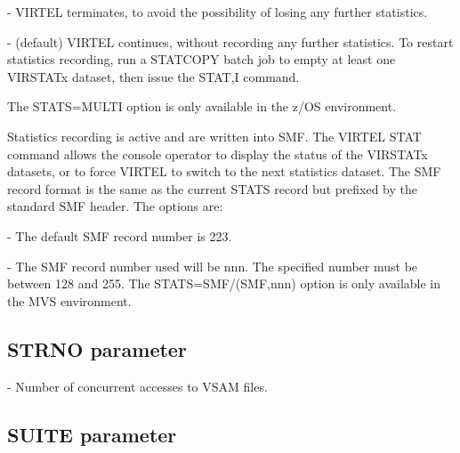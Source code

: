 \documentclass[letterpaper,10pt,english]{sphinxmanual}
\begin{document}
 - VIRTEL terminates, to avoid the possibility of losing any further statistics.

 - (default) VIRTEL continues, without recording any further statistics. To restart statistics recording, run a STATCOPY batch job to empty at least one VIRSTATx dataset, then issue the STAT,I command.

The STATS=MULTI option is only available in the z/OS environment.

 Statistics recording is active and are written into SMF. The VIRTEL STAT command allows the console operator to display the status of the VIRSTATx datasets, or to force VIRTEL to switch to the next statistics dataset. The SMF record format is the same as the current STATS record but prefixed by the standard SMF header. The options are:

 - The default SMF record number is 223.

 - The SMF record number used will be nnn. The specified number must be between 128 and 255. The STATS=SMF/(SMF,nnn) option is only available in the MVS environment.


\subsection{STRNO parameter}
\label{\detokenize{Installation_Guide:strno-parameter}}\label{\detokenize{Installation_Guide:index-118}}
\begin{sphinxVerbatim}[commandchars=\\\{\}]
 
\end{sphinxVerbatim}

 - Number of concurrent accesses to VSAM files.


\subsection{SUITE parameter}
\label{\detokenize{Installation_Guide:suite-parameter}}\label{\detokenize{Installation_Guide:index-119}}
\begin{sphinxVerbatim}[commandchars=\\\{\}]
 
\end{sphinxVerbatim}
\end{document}
